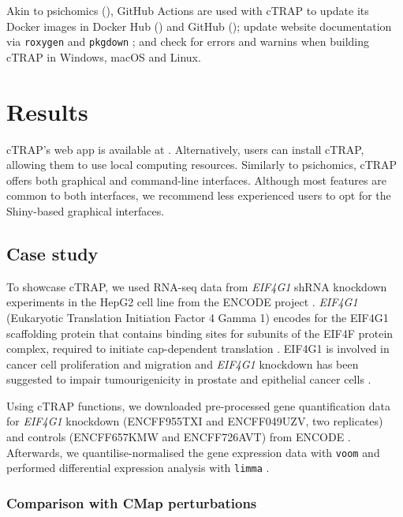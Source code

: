 Akin to psichomics (), GitHub Actions are used with cTRAP to update its Docker images in Docker Hub () and GitHub (); update website documentation via \texttt{roxygen} \cite{wickham:2021wt} and \texttt{pkgdown} \cite{wickham:2021wj}; and check for errors and warnins when building cTRAP in Windows, macOS and Linux.

\section{Results}

cTRAP's web app is available at . Alternatively, users can install cTRAP, allowing them to use local computing resources. Similarly to psichomics, cTRAP offers both graphical and command-line interfaces. Although most features are common to both interfaces, we recommend less experienced users to opt for the Shiny-based graphical interfaces.

\subsection{Case study}
\label{subsec:case-study}

To showcase cTRAP, we used RNA-seq data from \emph{EIF4G1} shRNA knockdown experiments in the HepG2 cell line from the ENCODE project \cite{luo:2019tp}. \emph{EIF4G1} (Eukaryotic Translation Initiation Factor 4 Gamma 1) encodes for the EIF4G1 scaffolding protein that contains binding sites for subunits of the EIF4F protein complex, required to initiate cap-dependent translation \cite{luo:2019tp,tu:2010vi,jaiswal:2018uq}. EIF4G1 is involved in cancer cell proliferation and migration and \emph{EIF4G1} knockdown has been suggested to impair tumourigenicity in prostate and epithelial cancer cells \cite{tu:2010vi,jaiswal:2018uq}.

Using cTRAP functions, we downloaded pre-processed gene quantification data for \emph{EIF4G1} knockdown (ENCFF955TXI and ENCFF049UZV, two replicates) and controls (ENCFF657KMW and ENCFF726AVT) from ENCODE \cite{luo:2019tp}. Afterwards, we quantilise-normalised the gene expression data with \texttt{voom} \cite{ritchie:2015tm} and performed differential expression analysis with \texttt{limma} \cite{ritchie:2015tm}.

\subsubsection{Comparison with CMap perturbations}

